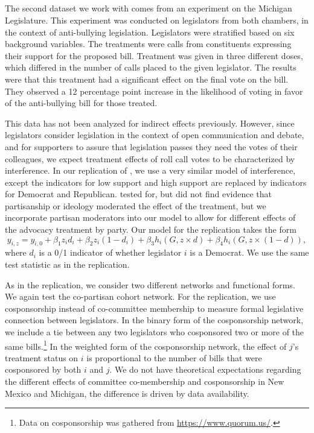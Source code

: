 \documentclass[12pt]{article}
\begin{document}
\subsection{\citet{bergan2015call}}


The second dataset we work with comes from an experiment on the Michigan Legislature. This experiment was conducted on legislators from both chambers, in the context of anti-bullying legislation. Legislators were stratified based on six background variables. The treatments were calls from constituents expressing their support for the proposed bill. Treatment was given in three different doses, which differed in the number of calls placed to the given legislator. The results were that this treatment had a significant effect on the final vote on the bill. They observed a 12 percentage point increase in the likelihood of voting in favor of the anti-bullying bill for those treated. 

This data has not been analyzed for indirect effects previously. However, since legislators consider legislation in the context of open communication and debate, and for supporters to assure that legislation passes they need the votes of their colleagues, we expect treatment effects of roll call votes to be characterized by interference. In our replication of  \citet{bergan2015call}, we use a very similar model of interference, except the indicators for low support and high support are replaced by indicators for Democrat and Republican.   \citet{bergan2015call} tested for, but did not find evidence that partisanship or ideology moderated the effect of the treatment, but we incorporate partisan moderators into our model to allow for different effects of the advocacy treatment by party. Our model for the 
\citet{bergan2015call} replication takes the form $$y_{i,z} = y_{i,0}+\beta_1z_id_i+\beta_2z_i(1-d_i)+\beta_3h_i(G,z\times d)+\beta_4h_i(G,z\times (1-d)),$$  where $d_i$ is a 0/1 indicator of whether legislator $i$ is a Democrat. We use the same test statistic as in the \citet{butler2011can} replication.

As in the \citet{butler2011can} replication, we consider two different networks and functional forms. We again test the co-partisan cohort network. For the \citet{bergan2015call} replication, we use cosponsorship instead of co-committee membership to measure formal legislative connection between legislators. In the binary form of the cosponsorship network, we include a tie between any two legislators who cosponsored two or more of the same bills.\footnote{Data on cosponsorship was gathered from \url{https://www.quorum.us/}.} In the weighted form of the cosponsorship network, the effect of $j$'s treatment status on $i$ is proportional to the number of bills that were cosponsored by both $i$ and $j$. We do not have theoretical expectations regarding the different effects of committee co-membership and cosponsorship in New Mexico and Michigan, the difference is driven by data availability. 
\end{document}

